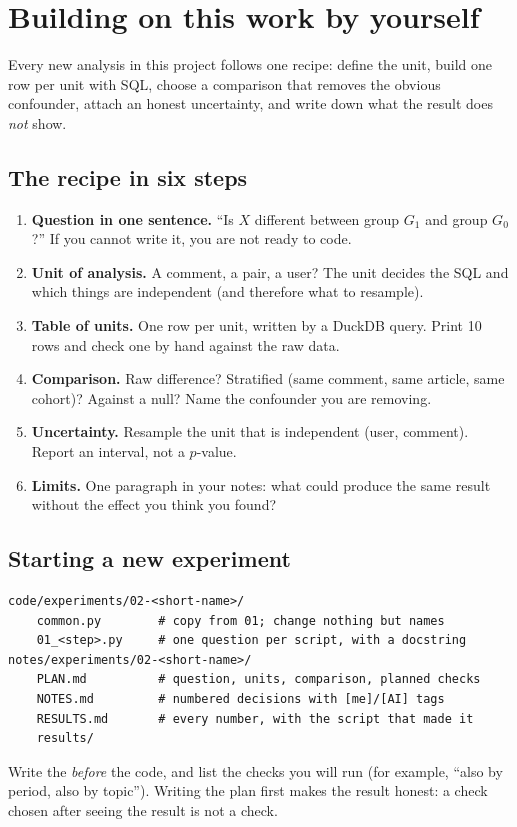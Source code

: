 \chapter{Building on this work by yourself}\label{ch:building}

\begin{idea}
Every new analysis in this project follows one recipe: define the unit, build one row per unit with SQL, choose a comparison that removes the obvious confounder, attach an honest uncertainty, and write down what the result does \emph{not} show.
\end{idea}

\section{The recipe in six steps}
\begin{enumerate}
  \item \textbf{Question in one sentence.} ``Is $X$ different between group $G_1$ and group $G_0$?'' If you cannot write it, you are not ready to code.
  \item \textbf{Unit of analysis.} A comment, a pair, a user? The unit decides the SQL and which things are independent (and therefore what to resample).
  \item \textbf{Table of units.} One row per unit, written by a DuckDB query. Print 10 rows and check one by hand against the raw data.
  \item \textbf{Comparison.} Raw difference? Stratified (same comment, same article, same cohort)? Against a null? Name the confounder you are removing.
  \item \textbf{Uncertainty.} Resample the unit that is independent (user, comment). Report an interval, not a $p$-value.
  \item \textbf{Limits.} One paragraph in your notes: what could produce the same result without the effect you think you found?
\end{enumerate}

\section{Starting a new experiment}
\begin{lstlisting}
code/experiments/02-<short-name>/
    common.py        # copy from 01; change nothing but names
    01_<step>.py     # one question per script, with a docstring
notes/experiments/02-<short-name>/
    PLAN.md          # question, units, comparison, planned checks
    NOTES.md         # numbered decisions with [me]/[AI] tags
    RESULTS.md       # every number, with the script that made it
    results/
\end{lstlisting}
Write the  \emph{before} the code, and list the checks you will run (for example, ``also by period, also by topic''). Writing the plan first makes the result honest: a check chosen after seeing the result is not a check.

